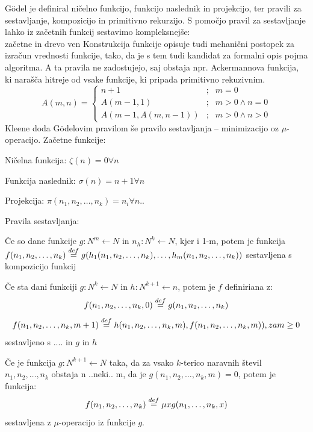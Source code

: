 \documentclass[10pt,a4paper,oneside]{book}
\begin{document}
Gödel je definiral ničelno funkcijo, funkcijo naslednik in projekcijo, ter pravili za sestavljanje, kompozicijo in primitivno rekurzijo.
\br
S pomočjo pravil za sestavljanje lahko iz začetnih funkcij sestavimo kompleksnejše:\\
\fixme začetne in drevo ven%
\br
Konstrukcija funkcije opisuje tudi mehanični postopek za izračun vrednosti funkcije, tako, da je s tem tudi kandidat za formalni opis pojma algoritma.
\br
A ta pravila ne zadostujejo, saj obstaja npr. Ackermannova funkcija, ki narašča hitreje od vsake funkcije, ki pripada primitivno rekuzivnim.
\[ A(m,n) = 
	\left\{ 
	\begin{array}{ccl}
	n+1&;& m=0\\
	A(m-1,1) &;& m>0 \wedge n=0\\
	A(m-1,A(m, n-1)) &;& m>0 \wedge n>0
	\end{array}
	\right.
\]
\br
Kleene doda Gödelovim pravilom še pravilo sestavljanja -- minimizacijo oz $\mu$-operacijo. %
\br
Začetne funkcije:
\begin{items}
\item Ničelna funkcija: $\zeta(n)=0 \forall n$
\item Funkcija naslednik: $\sigma(n)=n+1 \forall n$
\item Projekcija: $\pi(n_1, n_2, \dots, n_k)=n_i \forall n..$
\end{items}
Pravila sestavljanja:
\begin{items}
\item Če so dane funkcije $g:N^m \leftarrow N$ in $n_h:N^k \leftarrow N$, kjer i 1-m, potem je funkcija $f(n_1,n_2,\dots,n_k) \overset{def}{=} g(h_{1}(n_1,n_2,\dots,n_k),\dots,h_m(n_1,n_2,\dots,n_k))$ sestavljena s kompozicijo funkcij
\item Če sta dani funkciji $g:N^k \leftarrow N$ in $h:N^{k+1}  \leftarrow n$, potem je $f$ definiriana z:
	\[f(n_1, n_2, \dots, n_k, 0) \overset{def}{=} g(n_1, n_2, \dots, n_k)\]
	\[f(n_1, n_2, \dots, n_k, m+1) \overset{def}{=} h(n_1, n_2, \dots, n_k, m), f(n_1, n_2, \dots, n_k, m)), za m \geq 0\]
sestavljeno s .... in $g$ in $h$
\item Če je funkcija $g:N^{k+1} \leftarrow N$ taka, da za vsako $k$-terico naravnih števil $n_1, n_2, \dots, n_k$ obstaja n ..neki.. m, da je $g(n_1, n_2, \dots, n_k, m) = 0$, potem je funkcija:
\[ f(n_1, n_2, \dots, n_k) \overset{def}{=} \mu x g(n_1, \dots, n_k, x)\]
sestavljena z $\mu$-operacijo iz funkcije $g$.
\end{items}
\end{document}
